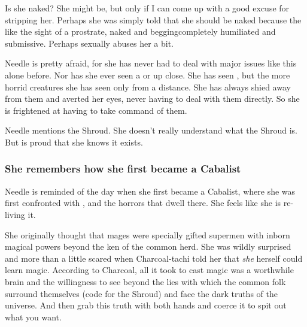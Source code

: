 \begin{garbage}
Is she naked? 
She might be, but only if I can come up with a good excuse for stripping her. 
Perhaps she was simply told that she should be naked because the \resphain{} like the sight of a \human{} prostrate, naked and begging\dash completely humiliated and submissive. 
Perhaps \Achsah{} sexually abuses her a bit. 

Needle is pretty afraid, for she has never had to deal with major issues like this alone before. 
Nor has she ever seen a \bane{} or \banerat{} up close. 
She has seen \resphain, but the more horrid creatures she has seen only from a distance. 
She has always shied away from them and averted her eyes, never having to deal with them directly. So she is frightened at having to take command of them. 

Needle mentions the Shroud. 
She doesn't really understand what the Shroud is. 
But is proud that she knows it exists. 





\subsubsection{She remembers how she first became a Cabalist}
Needle is reminded of the day when she first became a Cabalist, where she was first confronted with \itzach, \Nyx{} and the horrors that dwell there. 
She feels like she is re-living it. 


She originally thought that mages were specially gifted supermen with inborn magical powers beyond the ken of the common herd. 
She was wildly surprised and more than a little scared when Charcoal-tachi told her that \emph{she} herself could learn magic. 
According to Charcoal, all it took to cast magic was a worthwhile brain and the willingness to see beyond the lies with which the common folk surround themselves (code for the Shroud) and face the dark truths of the universe. 
And then grab this truth with both hands and coerce it to spit out what you want. 






\end{garbage}
